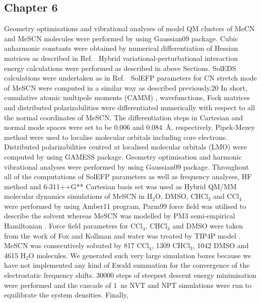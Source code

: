 \documentclass[a4paper,titlepage,twoside,fleqn,12pt]{book}
\begin{document}
\begin{appendices}
\begin{refsection}
\section{Chapter 6}

Geometry optimisations and vibrational analyses of model QM clusters of MeCN and
MeSCN molecules were performed by using Gaussian09 package. Cubic anharmonic
constants \citep{Barone.JCP.2005} were obtained by numerical differentiation of Hessian matrices as
described in Ref.~\citep{Blasiak.Cho.JCP.2015} 
Hybrid variational\hyp{}perturbational interaction energy calculations
were performed as described in above Sections. SolEDS
calculations were undertaken as in Ref.~\citep{Blasiak.Cho.JCP.2015} 
SolEFP parameters for CN stretch mode of
MeSCN were computed in a similar way as described previously.20 In short, cumulative
atomic multipole moments (CAMM) \citep{Sokalski.Poirier.CPL.1983}, 
wavefunctions, Fock matrices and distributed
polarizabilities were differentiated numerically with respect to all the normal
coordinates of MeSCN. The differentiation steps in Cartesian and normal mode spaces
were set to be 0.006 and 0.084~\AA, respectively. Pipek-Mezey method were used to
localise molecular orbitals including core electrons. Distributed polarizabilities centred
at localised molecular orbitals (LMO) were computed by using {\sc GAMESS} package.
Geometry optimisation and harmonic vibrational analyses were performed by using
{\sc Gaussian09} package. Throughout all of the computations of SolEFP parameters as well
as frequency analyses, HF method and 6-311++G** Cartesian basis set was used as
Hybrid QM/MM molecular dynamics simulations of MeSCN in H$_2$O, DMSO, CHCl$_3$ and
CCl$_4$ were performed by using {\sc Amber11} program, Parm99 force field \citep{Wang.Cieplak.Kollman.JCC.2000}
was utilised to
describe the solvent whereas MeSCN was modelled by PM3 semi\hyp{}empirical
Hamiltonian \citep{Stewart.JCC.1988}. Force field parameters for CCl$_4$, CHCl$_3$ and DMSO were taken from the
work of Fox and Kollman \citep{Fox.Kollman.JPCB.1998} and water was treated 
by TIP4P model \citep{Jorgensen.Chandrasekhar.Madura.Impey.Klein.JCP.1983}. MeSCN was
consecutively solvated by 817 CCl$_4$, 1309 CHCl$_3$, 1042 DMSO and 4615 H$_2$O molecules.
We generated such very large simulation boxes because we have not implemented any
kind of Ewald summation for the convergence of the electrostatic frequency shifts.
30000 steps of steepest descent energy minimisation were performed and the cascade
of 1~ns NVT and NPT simulations were run to equilibrate the system densities. Finally, 

\end{refsection}
\end{appendices}
\end{document}
